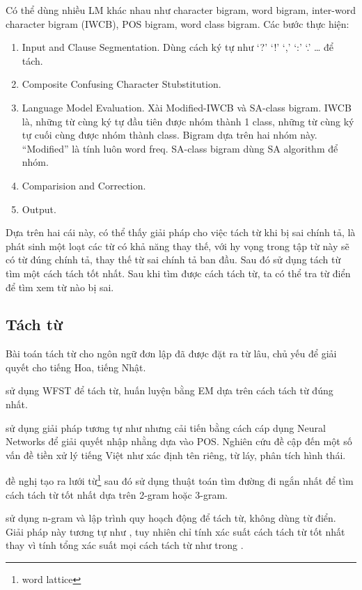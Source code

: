 \documentclass[a4paper]{book} %
\begin{document}
\cite{Chang} Có thể dùng nhiều LM khác nhau như character
bigram, word bigram, inter-word character bigram (IWCB), POS bigram,
word class bigram. Các bước thực hiện:
\begin{enumerate}
\item Input and Clause Segmentation. Dùng cách ký tự như `?' `!' `,'
  `:' `.' \ldots{} để tách.
\item Composite Confusing Character Stubstitution. 
\item Language Model Evaluation. Xài Modified-IWCB và SA-class
  bigram. IWCB là, những từ cùng ký tự đầu tiên được nhóm thành 1
  class, những từ cùng ký tự cuối cùng được nhóm thành class. Bigram
  dựa trên hai nhóm này. ``Modified'' là tính luôn word freq. SA-class
  bigram dùng SA algorithm để nhóm.
\item Comparision and Correction.
\item Output.
\end{enumerate}


Dựa trên hai cái này, có thể thấy giải pháp cho việc tách từ khi bị
sai chính tả, là phát sinh một loạt các từ có khả năng thay thế, với
hy vọng trong tập từ này sẽ có từ đúng chính tả, thay thế từ sai chính
tả ban đầu. Sau đó sử dụng tách từ tìm một cách tách tốt nhất. Sau khi
tìm được cách tách từ, ta có thể tra từ điển để tìm xem từ nào bị sai.


\subsection{Tách từ}

Bài toán tách từ cho ngôn ngữ đơn lập đã được đặt ra từ lâu, chủ yếu
để giải quyết cho tiếng Hoa, tiếng Nhật. 

\cite{Sproat} sử dụng WFST để tách từ, huấn luyện bằng EM dựa trên
cách tách từ đúng nhất.

\cite{wordseg} sử dụng giải pháp tương tự như \cite{Sproat} nhưng cải
tiến bằng cách cáp dụng Neural Networks để giải quyết nhập nhằng dựa
vào POS. Nghiên cứu đề cập đến một số vấn đề tiền xử lý tiếng Việt như
xác định tên riêng, từ láy, phân tích hình thái.

\cite{Ravishankar} đề nghị tạo ra lưới từ\footnote{word lattice} sau
đó sử dụng thuật toán tìm đường đi ngắn nhất để tìm cách tách từ tốt
nhất dựa trên 2-gram hoặc 3-gram.

\cite{LAH} sử dụng n-gram và lập trình quy hoạch động để tách từ,
không dùng từ điển. Giải pháp này tương tự như \cite{softcount}, tuy
nhiên chỉ tính xác suất cách tách từ tốt nhất thay vì tính tổng xác
suất mọi cách tách từ như trong \cite{softcount}.
\end{document}
